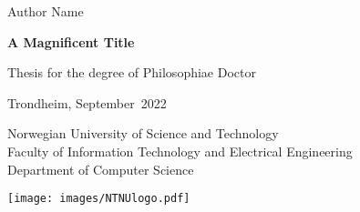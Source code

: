 \frontmatter
{
\sffamily
\parindent=0cm
\renewcommand{\headrulewidth}{0pt}
\addtolength{\parskip}{\baselineskip}
{\huge {Author Name}}
\vspace{2cm}

{\textbf {\fontsize{27}{32}\selectfont A Magnificent Title}}

{\LARGE }
\vspace{5cm}

{\Large Thesis for the degree of Philosophiae Doctor

Trondheim, September\ 2022

Norwegian University of Science and Technology \\
Faculty of Information Technology and Electrical Engineering \\
Department of Computer Science}
\vspace{5cm}

\texttt{[image: images/NTNUlogo.pdf]}

\newpage
}